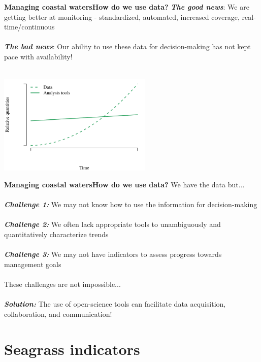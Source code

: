 \documentclass[serif]{beamer}\usepackage[]{graphicx}\usepackage[]{color}
\newcommand{\emtxt}[1]{\textbf{\textit{#1}}}
\begin{document}
\begin{frame}{\textbf{Managing coastal waters}}{\textbf{How do we use data?}}
\emtxt{The good news}: We are getting better at monitoring - standardized, automated, increased coverage, real-time/continuous \\~\\
\emtxt{The bad news}: Our ability to use these data for decision-making has not kept pace with availability! \\~\\


{\centering \includegraphics[width=0.55\textwidth]{fig/theo} 

}



\end{frame}

\begin{frame}{\textbf{Managing coastal waters}}{\textbf{How do we use data?}}
\onslide<+->
We have the data but... \\~\\
\emtxt{Challenge 1:} We may not know how to use the information for decision-making \\~\\
\emtxt{Challenge 2:} We often lack appropriate tools to unambiguously and quantitatively characterize trends \\~\\
\emtxt{Challenge 3:} We may not have indicators to assess progress towards management goals \\~\\
\onslide<+->
These challenges are not impossible...\\~\\
\emtxt{Solution:} The use of open-science tools can facilitate data acquisition, collaboration, and communication!
\end{frame}

\section{Seagrass indicators}
\end{document}
